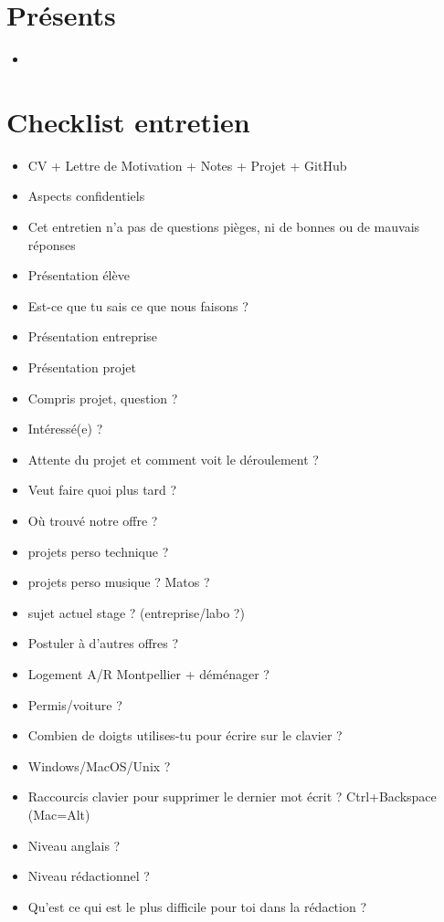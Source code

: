 \documentclass[12pt, a4paper]{article}
\begin{document}
\section*{Présents}
\begin{itemize}
    \item 
\end{itemize}
 
\section*{Checklist entretien}

\begin{itemize}
\item CV + Lettre de Motivation + Notes + Projet + GitHub 
\item Aspects confidentiels
\item Cet entretien n'a pas de questions pièges, ni de bonnes ou de mauvais réponses
\item Présentation élève
\item Est-ce que tu sais ce que nous faisons ?
\item Présentation entreprise
\item Présentation projet
\item Compris projet, question ?
\item Intéressé(e) ?
\item Attente du projet et comment voit le déroulement ?
\item Veut faire quoi plus tard ?
\item Où trouvé notre offre ?
\item projets perso technique ?
\item projets perso musique ? Matos ?
\item sujet actuel stage ? (entreprise/labo ?)
\item Postuler à d'autres offres ? 
\item Logement A/R Montpellier + déménager ?
\item Permis/voiture ?
\item Combien de doigts utilises-tu pour écrire sur le clavier ?
\item Windows/MacOS/Unix ? 
\item Raccourcis clavier pour supprimer le dernier mot écrit ? Ctrl+Backspace (Mac=Alt)
\item Niveau anglais ?
\item Niveau rédactionnel ?
\item Qu'est ce qui est le plus difficile pour toi dans la rédaction ?

\end{itemize}
\end{document}
